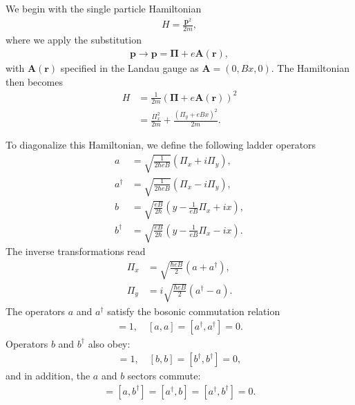 We begin with the single particle Hamiltonian
\begin{gather}
	H = \frac{\mathbf{p}^{2}}{2m},
\end{gather}
where we apply the substitution
\begin{gather}
	\mathbf{p} \to \mathbf{p} = \boldsymbol{\Pi} + e \mathbf{A}(\mathbf{r}),
\end{gather}
with $\mathbf{A}(\mathbf{r})$ specified in the Landau gauge as $\mathbf{A} = (0, Bx, 0)$. The Hamiltonian then becomes
\begin{equation}
	\begin{aligned}
		H &= \frac{1}{2m} \left(\boldsymbol{\Pi} + e\mathbf{A}(\mathbf{r})\right)^2 \\
		&= \frac{\Pi_{x}^{2}}{2m} + \frac{(\Pi_{y} + eBx)^2}{2m}.
	\end{aligned}
\end{equation}

To diagonalize this Hamiltonian, we define the following ladder operators
\begin{equation}
	\begin{aligned}
		a &= \sqrt{\frac{1}{2\hbar eB}} \left(\Pi_{x} + i \Pi_{y}\right), \\
		a^{\dagger} &= \sqrt{\frac{1}{2\hbar eB}} \left(\Pi_{x} - i \Pi_{y}\right), \\
		b &= \sqrt{\frac{eB}{2\hbar}} \left(y - \frac{1}{eB} \Pi_{x} + i x\right), \\
		b^{\dagger} &= \sqrt{\frac{eB}{2\hbar}} \left(y - \frac{1}{eB} \Pi_{x} - i x\right).
	\end{aligned}
\end{equation}
The inverse transformations read
\begin{equation}
	\begin{aligned}
		\Pi_{x} &= \sqrt{\frac{\hbar eB}{2}} (a + a^{\dagger}), \\
		\Pi_{y} &= i\sqrt{\frac{\hbar eB}{2}} (a^{\dagger} - a).
	\end{aligned}
\end{equation}
The operators $a$ and $a^{\dagger}$ satisfy the bosonic commutation relation
\begin{gather}
	[a, a^{\dagger}] = 1, \quad [a, a] = [a^{\dagger}, a^{\dagger}] = 0.
\end{gather}
Operators $b$ and $b^{\dagger}$ also obey:
\begin{gather}
	[b, b^{\dagger}] = 1, \quad [b, b] = [b^{\dagger}, b^{\dagger}] = 0,
\end{gather}
and in addition, the $a$ and $b$ sectors commute:
\begin{gather}
	[a, b] = [a, b^{\dagger}] = [a^{\dagger}, b] = [a^{\dagger}, b^{\dagger}] = 0.
\end{gather}

